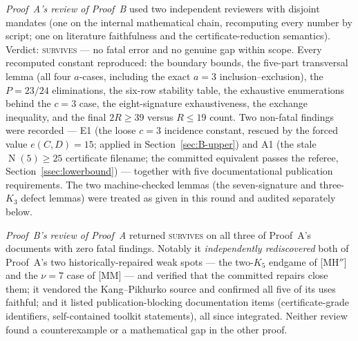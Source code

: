 \documentclass[11pt,reqno]{amsart}
\theoremstyle{definition}
\theoremstyle{remark}
\DeclareMathOperator{\Ncap}{N}
\begin{document}
\emph{Proof~A's review of Proof~B} used two independent reviewers with disjoint mandates
(one on the internal mathematical chain, recomputing every number by script; one on
literature faithfulness and the certificate-reduction semantics). Verdict:
\textsc{survives} --- no fatal error and no genuine gap within scope. Every recomputed
constant reproduced: the boundary bounds, the five-part transversal lemma (all four
$a$-cases, including the exact $a=3$ inclusion--exclusion), the $P=23/24$ eliminations, the
six-row stability table, the exhaustive enumerations behind the $c=3$ case, the
eight-signature exhaustiveness, the exchange inequality, and the final $2R\ge 39$ versus
$R\le 19$ count. Two non-fatal findings were recorded --- E1 (the loose $c=3$ incidence
constant, rescued by the forced value $e(C,D)=15$; applied in Section~\ref{sec:B-upper})
and A1 (the stale $\Ncap(5)\ge 25$ certificate filename; the committed equivalent passes
the referee, Section~\ref{ssec:lowerbound}) --- together with five documentational
publication requirements. The two machine-checked lemmas (the seven-signature and
three-$K_3$ defect lemmas) were treated as given in this round and audited separately
below.

\emph{Proof~B's review of Proof~A} returned \textsc{survives} on all three of Proof~A's
documents with zero fatal findings. Notably it \emph{independently rediscovered} both of
Proof~A's two historically-repaired weak spots --- the two-$K_5$ endgame of
\textsf{[MH$''$]} and the $\nu=7$ case of \textsf{[MM]} --- and verified that the committed
repairs close them; it vendored the Kang--Pikhurko source and confirmed all five of its
uses faithful; and it listed publication-blocking documentation items (certificate-grade
identifiers, self-contained toolkit statements), all since integrated. Neither review
found a counterexample or a mathematical gap in the other proof.
\end{document}
